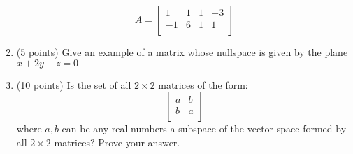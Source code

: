 \documentclass[10pt, a4paper]{article}
\theoremstyle{break}
\begin{document}
\begin{enumerate}
\begin{equation}
A=
\begin{bmatrix}
 1& 1 & 1  &-3\\
 -1 & 6 & 1 &1 \\
\end{bmatrix}
\end{equation}
\item (5 points) Give an example of a matrix whose nullspace is given by the plane $x+2y-z=0$
\item (10 points) Is the set of all $2\times 2$ matrices of the form:
\begin{equation}
\begin{bmatrix}
a & b \\
b & a \\
\end{bmatrix}
\end{equation}
where $a,b$ can be any real numbers a subspace of the vector space formed by all $2 \times 2 $ matrices? Prove your answer. 

\end{enumerate}
\end{document}
